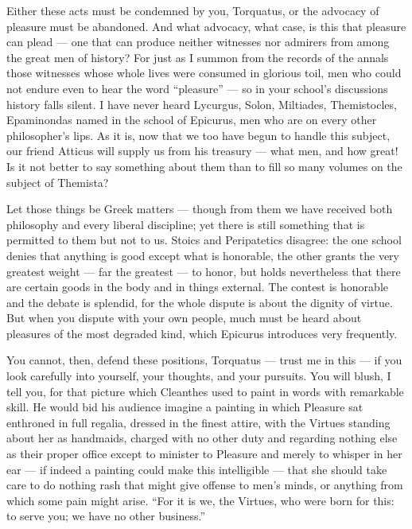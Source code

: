  Either these acts must be condemned by you, Torquatus, or the advocacy of pleasure must be abandoned. And what advocacy, what case, is this that pleasure can plead — one that can produce neither witnesses nor admirers from among the great men of history? For just as I summon from the records of the annals those witnesses whose whole lives were consumed in glorious toil, men who could not endure even to hear the word ``pleasure'' — so in your school's discussions history falls silent. I have never heard Lycurgus, Solon, Miltiades, Themistocles, Epaminondas named in the school of Epicurus, men who are on every other philosopher's lips. As it is, now that we too have begun to handle this subject, our friend Atticus will supply us from his treasury — what men, and how great! Is it not better to say something about them than to fill so many volumes on the subject of Themista?

 Let those things be Greek matters — though from them we have received both philosophy and every liberal discipline; yet there is still something that is permitted to them but not to us. Stoics and Peripatetics disagree: the one school denies that anything is good except what is honorable, the other grants the very greatest weight — far the greatest — to honor, but holds nevertheless that there are certain goods in the body and in things external. The contest is honorable and the debate is splendid, for the whole dispute is about the dignity of virtue. But when you dispute with your own people, much must be heard about pleasures of the most degraded kind, which Epicurus introduces very frequently.

 You cannot, then, defend these positions, Torquatus — trust me in this — if you look carefully into yourself, your thoughts, and your pursuits. You will blush, I tell you, for that picture which Cleanthes used to paint in words with remarkable skill. He would bid his audience imagine a painting in which Pleasure sat enthroned in full regalia, dressed in the finest attire, with the Virtues standing about her as handmaids, charged with no other duty and regarding nothing else as their proper office except to minister to Pleasure and merely to whisper in her ear — if indeed a painting could make this intelligible — that she should take care to do nothing rash that might give offense to men's minds, or anything from which some pain might arise. ``For it is we, the Virtues, who were born for this: to serve you; we have no other business.''


